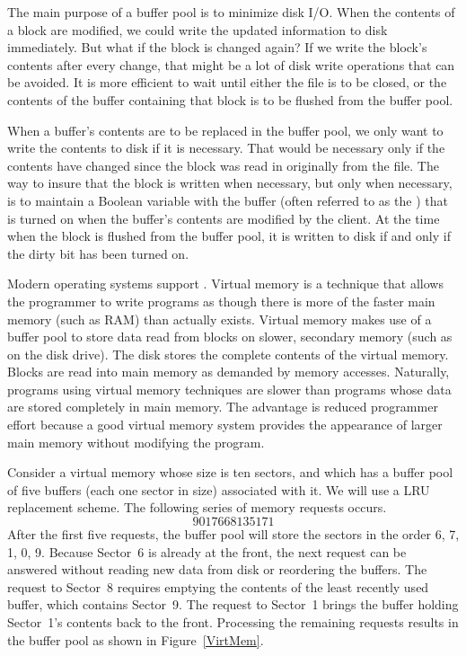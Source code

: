 The main purpose of a buffer pool is to minimize disk I/O.
When the contents of a block are modified, we could write the updated
information to disk immediately.
But what if the block is changed again?
If we write the block's contents after every change, that might be a
lot of disk write operations that can be avoided.
It is more efficient to wait until either the file is to be closed,
or the contents of the buffer containing that block is to be flushed
from the buffer pool.

When a buffer's contents are to be replaced in the buffer pool,
we only want to write the contents to disk if it is necessary.
That would be necessary only if the contents have changed since the
block was read in originally from the file.
The way to insure that the block is written when necessary, but only
when necessary, is to maintain a Boolean variable with the buffer
(often referred to as the ) that is turned on when
the buffer's contents are modified by the client.
At the time when the block is flushed from the buffer pool, it is
written to disk if and only if the dirty bit has been turned on.

Modern operating systems support
.
Virtual memory is a technique that allows the programmer to write
programs as though there is more of the faster main memory (such as
RAM) than actually exists.
Virtual memory makes use of a buffer pool to store data read from
blocks on slower, secondary memory (such as on the disk drive).
The disk stores the complete contents of the virtual memory.
Blocks are read into main memory as demanded by memory accesses.
Naturally, programs using virtual memory techniques are slower than
programs whose data are stored completely in main memory.
The advantage is reduced programmer effort because a good virtual memory
system provides the appearance of larger main memory without
modifying the program.

\begin{example}
Consider a virtual memory whose size is ten sectors, and which has a
buffer pool of five buffers (each one sector in size) associated with
it.
We will use a LRU replacement scheme.
The following series of memory requests occurs.
\[9 0 1 7 6 6 8 1 3 5 1 7 1\]
\noindent After the first five requests, the buffer pool will store
the sectors in the order 6, 7, 1, 0, 9.
Because Sector~6 is already at the front, the next request can be
answered without reading new data from disk or reordering the
buffers.
The request to Sector~8 requires emptying the contents of the least
recently used buffer, which contains Sector~9.
The request to Sector~1 brings the buffer holding Sector~1's contents
back to the front.
Processing the remaining requests results in the buffer pool as shown
in Figure~\ref{VirtMem}.
\end{example}


